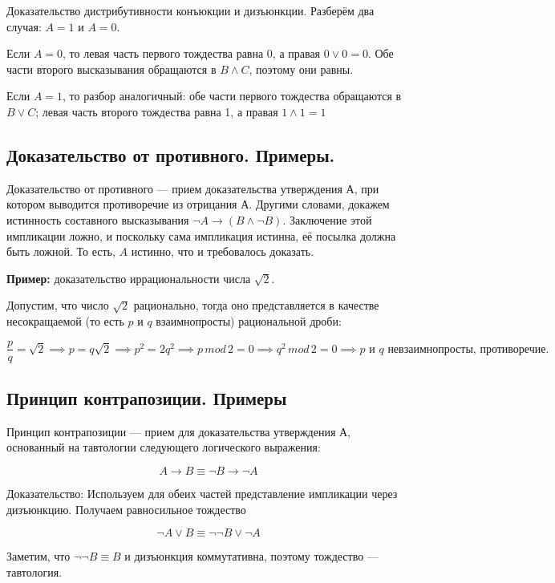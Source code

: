\documentclass[a4paper, 10pt]{article}
\begin{document}
Доказательство дистрибутивности конъюкции и дизъюнкции. Разберём два случая: $A = 1$ и $A = 0$.

Если $A = 0$, то левая часть первого тождества равна $0$, а правая $0 \vee 0 = 0$. Обе части второго высказывания обращаются в $B \wedge C$, поэтому они равны.

Если $A = 1$, то разбор аналогичный: обе части первого тождества обращаются в $B \vee C$; левая часть второго тождества равна 1, а правая $1 \wedge 1 = 1$


\subsection{Доказательство от противного. Примеры.}

Доказательство от противного --- прием доказательства утверждения А, при котором выводится противоречие из отрицания А. Другими словами, докажем истинность составного высказывания $\neg A \rightarrow (B \wedge \neg B)$. Заключение этой импликации ложно, и поскольку сама импликация истинна, её посылка должна быть ложной. То есть, $A$ истинно, что и требовалось доказать.

\textbf{Пример:} доказательство иррациональности числа $\sqrt{2}$.

Допустим, что число $\sqrt{2}$ рационально, тогда оно представляется в качестве несокращаемой (то есть $p$ и $q$ взаимнопросты) рациональной дроби: 

\[
\frac{p}{q}=\sqrt{2} \implies p=q\sqrt{2} \implies p^2=2q^2 \implies p \, mod \, 2 = 0 \implies q^2 \, mod \, 2 = 0 \implies p \text{ и } q \text{ невзаимнопросты, противоречие.}
\]

\subsection{Принцип контрапозиции. Примеры}

Принцип контрапозиции --- прием для доказательства утверждения А, основанный на тавтологии следующего логического выражения:

$$A \rightarrow B \equiv \neg B \rightarrow \neg A$$

Доказательство: Используем для обеих частей представление импликации через дизъюнкцию. Получаем равносильное тождество

$$\neg A \vee B \equiv \neg \neg B \vee \neg A$$

Заметим, что $\neg \neg B \equiv B$ и дизъюнкция коммутативна, поэтому тождество --- тавтология.
\end{document}
